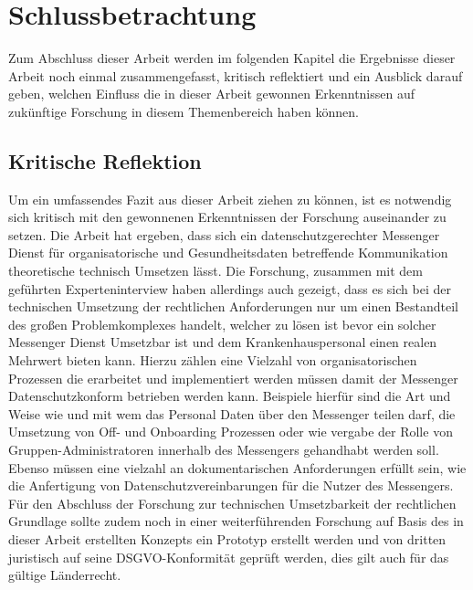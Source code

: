 \chapter{Schlussbetrachtung}\label{chapter:schlussbetrachtung}
Zum Abschluss dieser Arbeit werden im folgenden Kapitel die Ergebnisse dieser Arbeit noch einmal zusammengefasst, kritisch reflektiert und ein Ausblick darauf geben, welchen Einfluss die in dieser Arbeit gewonnen Erkenntnissen auf zukünftige Forschung in diesem Themenbereich haben können.

\section{Kritische Reflektion}\label{chapter:kr}
Um ein umfassendes Fazit aus dieser Arbeit ziehen zu können, ist es notwendig sich kritisch mit den gewonnenen Erkenntnissen der Forschung auseinander zu setzen. Die Arbeit hat ergeben, dass sich ein datenschutzgerechter Messenger Dienst für organisatorische und Gesundheitsdaten betreffende Kommunikation theoretische technisch Umsetzen lässt. Die Forschung, zusammen mit dem geführten Experteninterview haben allerdings auch gezeigt, dass es sich bei der technischen Umsetzung der rechtlichen Anforderungen nur um einen Bestandteil des großen Problemkomplexes handelt, welcher zu lösen ist bevor ein solcher Messenger Dienst Umsetzbar ist und dem Krankenhauspersonal einen realen Mehrwert bieten kann.  Hierzu zählen eine Vielzahl von organisatorischen Prozessen die erarbeitet und implementiert werden müssen damit der Messenger Datenschutzkonform betrieben werden kann. Beispiele hierfür sind die Art und Weise wie und mit wem das Personal Daten über den Messenger teilen darf, die Umsetzung von Off- und Onboarding Prozessen oder wie vergabe der Rolle von Gruppen-Administratoren innerhalb des Messengers gehandhabt werden soll. Ebenso müssen eine vielzahl an dokumentarischen Anforderungen erfüllt sein, wie die Anfertigung von Datenschutzvereinbarungen für die Nutzer des Messengers.
Für den Abschluss der Forschung zur technischen Umsetzbarkeit der rechtlichen Grundlage sollte zudem noch in einer weiterführenden Forschung auf Basis des in dieser Arbeit erstellten Konzepts ein Prototyp erstellt werden und von dritten juristisch auf seine DSGVO-Konformität geprüft werden, dies gilt auch für das gültige Länderrecht.

